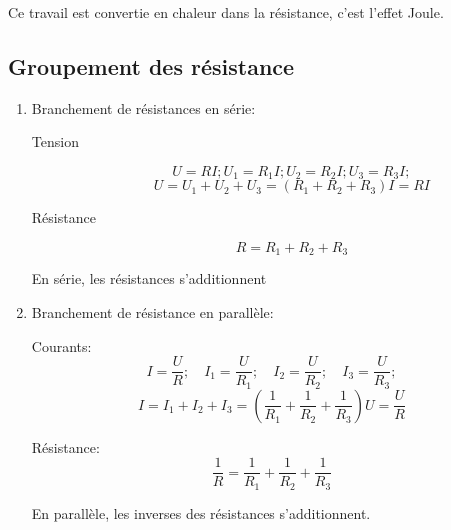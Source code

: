 \documentclass[
    11pt,
    a4paper,
    oneside,
    headinlcude, footinclude,
    twoside,
]{report}
\begin{document}
Ce travail est convertie en chaleur dans la résistance, c'est l'effet Joule.


\subsection{Groupement des résistance}
\label{sub:groupement_des_resistance}

\begin{enumerate}
    \item Branchement de résistances en série:

        \begin{center}
        \end{center}

        \begin{description}
            \item[Tension] 
                $$U = RI; U_1 = R_1 I; U_2 = R_2 I; U_3 = R_3 I;$$
                $$U = U_1 + U_2 + U_3  = ( R_1 + R_2 + R_3 )I= RI$$
            \item[Résistance]
                \begin{equation}
                    \label{eq:8.20} 
                    R = R_1 + R_2 + R_3
                \end{equation}
        \end{description}

        En série, les résistances s'additionnent 

    \item Branchement de résistance en parallèle:

        \begin{center}
        \end{center}


        Courants: $$I = \frac{U}{R}; \quad I_1 = \frac{U}{R_1} ;  \quad I_2 = \frac{U}{R_2} ; \quad I_3 = \frac{U}{R_3} ;$$
        $$I = I_1 + I_2 + I_3 = \left(\frac{1}{R_1} +\frac{1}{R_2} +\frac{1}{R_3}\right)U=
        \frac{U}{R}$$

        Résistance:
        \begin{equation}
            \label{eq:8.21}
            \frac{1}{R}  = \frac{1}{R_1} + \frac{1}{R_2} + \frac{1}{R_3}
        \end{equation}

        En parallèle, les inverses des résistances s'additionnent.

\end{enumerate}
\end{document}

